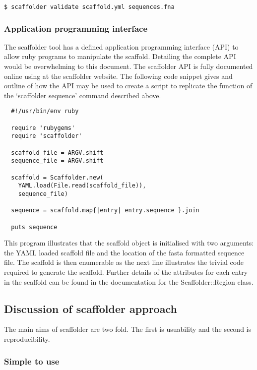 \documentclass[10pt]{bmc_article}
\newenvironment{bmcformat}{\begin{raggedright}\baselineskip20pt\sloppy\setboolean{publ}{false}}{\end{raggedright}\baselineskip20pt\sloppy}
\begin{document}
\begin{bmcformat}
\begin{verbatim}
$ scaffolder validate scaffold.yml sequences.fna
\end{verbatim}

\subsubsection*{Application programming interface} %

The scaffolder tool has a defined application programming interface (API) to
allow ruby programs to manipulate the scaffold. Detailing the complete API
would be overwhelming to this document. The scaffolder API is fully documented
online using at the scaffolder website. The following code snippet gives and
outline of how the API may be used to create a script to replicate the
function of the `scaffolder sequence' command described above. \pb

\begin{verbatim}
  #!/usr/bin/env ruby

  require 'rubygems'
  require 'scaffolder'

  scaffold_file = ARGV.shift
  sequence_file = ARGV.shift

  scaffold = Scaffolder.new(
    YAML.load(File.read(scaffold_file)),
    sequence_file)

  sequence = scaffold.map{|entry| entry.sequence }.join

  puts sequence
\end{verbatim}

This program illustrates that the scaffold object is initialised with two arguments: the YAML loaded scaffold file and the location of the fasta formatted sequence file. The scaffold is then enumerable as the next line illustrates the trivial code required to generate the scaffold. Further details of the attributes for each entry in the scaffold can be found in the documentation for the Scaffolder::Region class. \pb

\subsection*{Discussion of scaffolder approach} %

The main aims of scaffolder are two fold. The first is usuability and the second is reproducibility.

\subsubsection{Simple to use}


\end{bmcformat}
\end{document}

